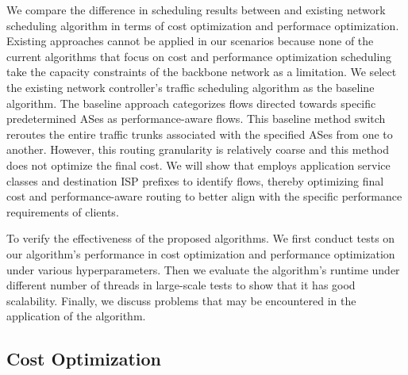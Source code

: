 We compare the difference in scheduling results between {\sys} and existing network scheduling algorithm in terms of cost optimization and performace optimization. Existing approaches cannot be applied in our scenarios because none of the current algorithms that focus on cost and performance optimization scheduling take the capacity constraints of the backbone network as a limitation. We select the existing network controller’s traffic scheduling algorithm as the baseline algorithm. The baseline approach categorizes flows directed towards specific predetermined ASes as performance-aware flows. This baseline method switch reroutes the entire traffic trunks associated with the specified ASes from one {\egress} to another. However, this routing granularity is relatively coarse and this method does not optimize the final cost. We will show that {\sys} employs application service classes and destination ISP prefixes to identify flows, thereby optimizing final cost and performance-aware routing to better align with the specific performance requirements of clients.

To verify the effectiveness of the proposed algorithms. We first conduct tests on our algorithm's performance in cost optimization and performance optimization under various hyperparameters. Then we evaluate the algorithm's runtime under different number of threads in large-scale tests to show that it has good scalability. Finally, we discuss problems that may be encountered in the application of the algorithm.





\subsection{Cost Optimization} \label{Cost Optimization}

